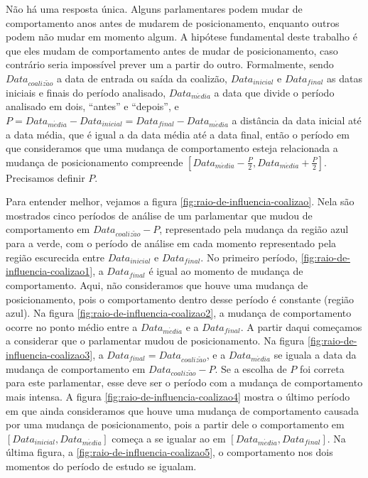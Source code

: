 \documentclass[a4paper,titlepage]{ppgi}\usepackage[]{graphicx}\usepackage[]{color}
\begin{document}
Não há uma resposta única. Alguns parlamentares podem mudar de comportamento
anos antes de mudarem de posicionamento, enquanto outros podem não mudar em
momento algum. A hipótese fundamental deste trabalho é que eles mudam de
comportamento antes de mudar de posicionamento, caso contrário seria impossível
prever um a partir do outro. Formalmente, sendo $Data_{coaliz\tilde{a}o}$ a
data de entrada ou saída da coalizão, $Data_{inicial}$ e $Data_{final}$ as
datas iniciais e finais do período analisado, $Data_{m\acute{e}dia}$ a data que
divide o período analisado em dois, ``antes'' e ``depois'', e $P =
Data_{m\acute{e}dia} - Data_{inicial} = Data_{final} -
Data_{m\acute{e}dia}$ a distância da data inicial até a data média, que é igual
a da data média até a data final, então o período em que consideramos que uma
mudança de comportamento esteja relacionada a mudança de posicionamento
compreende $\left[Data_{m\acute{e}dia} - \frac{P}{2}, Data_{m\acute{e}dia} +
\frac{P}{2}\right]$. Precisamos definir $P$.

Para entender melhor, vejamos a figura \ref{fig:raio-de-influencia-coalizao}.
Nela são mostrados cinco períodos de análise de um parlamentar que mudou de
comportamento em $Data_{coaliz\tilde{a}o} - P$, representado pela mudança da
região azul para a verde, com o período de análise em cada momento representado
pela região escurecida entre $Data_{inicial}$ e $Data_{final}$. No primeiro
período, \ref{fig:raio-de-influencia-coalizao1}, a $Data_{final}$ é igual ao
momento de mudança de comportamento. Aqui, não consideramos que houve uma
mudança de posicionamento, pois o comportamento dentro desse período é
constante (região azul). Na figura \ref{fig:raio-de-influencia-coalizao2}, a
mudança de comportamento ocorre no ponto médio entre a $Data_{m\acute{e}dia}$ e
a $Data_{final}$. A partir daqui começamos a considerar que o parlamentar mudou
de posicionamento. Na figura \ref{fig:raio-de-influencia-coalizao3}, a
$Data_{final} = Data_{coaliz\tilde{a}o}$, e a $Data_{m\acute{e}dia}$ se iguala
a data da mudança de comportamento em $Data_{coaliz\tilde{a}o} - P$. Se a
escolha de $P$ foi correta para este parlamentar, esse deve ser o período com a
mudança de comportamento mais intensa. A figura
\ref{fig:raio-de-influencia-coalizao4} mostra o último período em que ainda
consideramos que houve uma mudança de comportamento causada por uma mudança de
posicionamento, pois a partir dele o comportamento em $\left[Data_{inicial},
Data_{m\acute{e}dia}\right]$ começa a se igualar ao em
$\left[Data_{m\acute{e}dia}, Data_{final}\right]$. Na última figura, a
\ref{fig:raio-de-influencia-coalizao5}, o comportamento nos dois momentos do
período de estudo se igualam.
\end{document}
